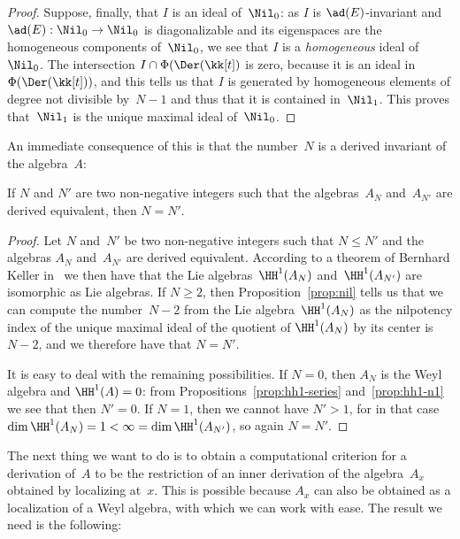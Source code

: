 \begin{proof}
Suppose, finally, that
$I$ is an ideal of~$\Nil_0$: as $I$ is $\ad(E)$-invariant and
$\ad(E):\Nil_0\to\Nil_0$ is diagonalizable and its eigenspaces are the
homogeneous components of~$\Nil_0$, we see that $I$ is a \emph{homogeneous}
ideal of~$\Nil_0$. The intersection $I\cap\Phi(\Der(\kk[t])$ is zero,
because it is an ideal in~$\Phi(\Der(\kk[t]))$, and this tells us that $I$
is generated by homogeneous elements of degree not divisible by~$N-1$ and
thus that it is contained in~$\Nil_1$. This proves that~$\Nil_1$ is the
unique maximal ideal of~$\Nil_0$.
\end{proof}

An immediate consequence of this is that the number~$N$ is a derived
invariant of the algebra~$A$:

\begin{Corollary}\label{coro:n-inv}
If $N$ and $N'$ are two non-negative integers such that the algebras~$A_N$
and~$A_{N'}$ are derived equivalent, then $N=N'$.
\end{Corollary}

\begin{proof}
Let $N$ and~$N'$ be two non-negative integers such that $N\leq N'$ and the
algebras $A_N$ and~$A_{N'}$ are derived equivalent. According to a theorem
of Bernhard Keller in~\cite{Keller} we then have that the Lie
algebras~$\HH^1(A_N)$ and~$\HH^1(A_{N'})$ are isomorphic as Lie algebras.
If $N\geq2$, then Proposition~\ref{prop:nil} tells us that we can compute
the number~$N-2$ from the Lie algebra~$\HH^1(A_N)$ as the nilpotency index
of the unique maximal ideal of the quotient of $\HH^1(A_N)$ by its center
is $N-2$, and we therefore have that $N=N'$.

It is easy to deal with the remaining possibilities. If $N=0$, then $A_N$
is the Weyl algebra and $\HH^1(A)=0$: from
Propositions~\ref{prop:hh1-series} and~\ref{prop:hh1-n1} we see that then
$N'=0$. If $N=1$, then we cannot have $N'>1$, for in that case
$\dim\HH^1(A_N)=1<\infty=\dim\HH^1(A_{N'})$, so again $N=N'$.
\end{proof}

The next thing we want to do is to obtain a computational criterion for a
derivation of~$A$ to be the restriction of an inner derivation of the
algebra~$A_x$ obtained by localizing at~$x$. This is possible because $A_x$
can also be obtained as a localization of a Weyl algebra, with which we can
work with ease. The result we need is the following:

